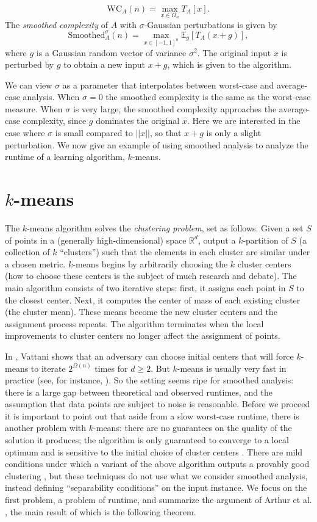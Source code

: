 \documentclass[11pt]{article}
\theoremstyle{definition}
\begin{document}
$$\mbox{WC}_A(n) = \max_{x \in \Omega_n}T_A[x].$$
The \emph{smoothed complexity} of $A$ with $\sigma$-Gaussian perturbations is given by
$$\mbox{Smoothed}_A^{\sigma}(n) = \max_{x\in [-1,1]^n}
\mathbb{E}_g[T_A(x + g)],$$ where $g$ is a Gaussian random vector of
variance $\sigma^2$. The original input $x$ is perturbed by $g$ to
obtain a new input $x + g$, which is given to the algorithm.

We can view $\sigma$ as a parameter that interpolates between
worst-case and average-case analysis. When $\sigma = 0$ the smoothed
complexity is the same as the worst-case measure. When $\sigma$ is
very large, the smoothed complexity approaches the average-case
complexity, since $g$ dominates the original $x$. Here we are
interested in the case where $\sigma$ is small compared to $||x||$, so
that $x + g$ is only a slight perturbation. We now give an example of
using smoothed analysis to analyze the runtime of a learning
algorithm, $k$-means.

\section{$k$-means}
The $k$-means algorithm solves the \emph{clustering problem}, set as
follows. Given a set $S$ of points in a (generally high-dimensional)
space $\mathbb{R}^d$, output a $k$-partition of $S$ (a collection of
$k$ ``clusters'') such that the elements in each cluster are similar
under a chosen metric. $k$-means begins by arbitrarily choosing the
$k$ cluster centers (how to choose these centers is the subject of
much research and debate). The main algorithm consists of two
iterative steps: first, it assigns each point in $S$ to the closest
center. Next, it computes the center of mass of each existing cluster
(the cluster mean). These means become the new cluster centers and the
assignment process repeats. The algorithm terminates when the local
improvements to cluster centers no longer affect the assignment of
points.

In \cite{KMworstcase}, Vattani shows that an adversary can choose
initial centers that will force $k$-means to iterate $2^{\Omega(n)}$
times for $d \ge 2$. But $k$-means is usually very fast in practice
(see, for instance, \cite{kmeansfast}). So the setting seems ripe for smoothed
analysis: there is a large gap between theoretical and observed
runtimes, and the assumption that data points are subject to noise is
reasonable. Before we proceed it is important to point out that aside
from a slow worst-case runtime, there is another problem with $k$-means: there
are no guarantees on the quality of the solution it produces; the
algorithm is only guaranteed to converge to a local optimum and is
sensitive to the initial choice of cluster centers
\cite{kmeanssensitive}. There are mild conditions under which a
variant of the above algorithm outputs a provably good clustering
\cite{kmeansprovable}, but these techniques do not use what we
consider smoothed analysis, instead defining ``separability
conditions'' on the input instance. We focus on the first problem, a
problem of runtime, and summarize the argument of Arthur et
al. \cite{SAkmeans}, the main result of which is the following
theorem.
\end{document}
